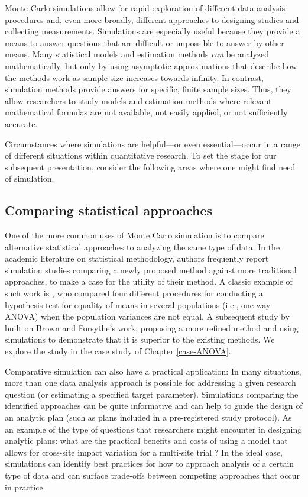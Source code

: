 \documentclass[
]{book}
\begin{document}
Monte Carlo simulations allow for rapid exploration of different data analysis procedures and, even more broadly, different approaches to designing studies and collecting measurements. Simulations are especially useful because they provide a means to answer questions that are difficult or impossible to answer by other means.
Many statistical models and estimation methods \emph{can} be analyzed mathematically, but only by using asymptotic approximations that describe how the methods work as sample size increases towards infinity.
In contrast, simulation methods provide answers for specific, finite sample sizes.
Thus, they allow researchers to study models and estimation methods where relevant mathematical formulas are not available, not easily applied, or not sufficiently accurate.

Circumstances where simulations are helpful---or even essential---occur in a range of different situations within quantitative research.
To set the stage for our subsequent presentation, consider the following areas where one might find need of simulation.

\subsection{Comparing statistical approaches}\label{comparing-statistical-approaches}

One of the more common uses of Monte Carlo simulation is to compare alternative statistical approaches to analyzing the same type of data.
In the academic literature on statistical methodology, authors frequently report simulation studies comparing a newly proposed method against more traditional approaches, to make a case for the utility of their method.
A classic example of such work is \citet{brown1974SmallSampleBehavior}, who compared four different procedures for conducting a hypothesis test for equality of means in several populations (i.e., one-way ANOVA) when the population variances are not equal.
A subsequent study by \citet{mehrotra1997ImprovingBrownforsytheSolution} built on Brown and Forsythe's work, proposing a more refined method and using simulations to demonstrate that it is superior to the existing methods.
We explore the \citet{brown1974SmallSampleBehavior} study in the case study of Chapter \ref{case-ANOVA}.

Comparative simulation can also have a practical application: In many situations, more than one data analysis approach is possible for addressing a given research question (or estimating a specified target parameter).
Simulations comparing the identified approaches can be quite informative and can help to guide the design of an analytic plan (such as plans included in a pre-registered study protocol).
As an example of the type of questions that researchers might encounter in designing analytic plans: what are the practical benefits and costs of using a model that allows for cross-site impact variation for a multi-site trial \citep{miratrix2021applied}?
In the ideal case, simulations can identify best practices for how to approach analysis of a certain type of data and can surface trade-offs between competing approaches that occur in practice.
\end{document}
